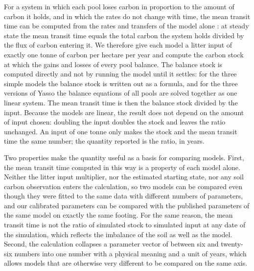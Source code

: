 \documentclass[11pt]{article}
\begin{document}
For a system in which each pool loses carbon in proportion to the amount of carbon it
holds, and in which the rates do not change with time, the mean transit time can be
computed from the rates and transfers of the model alone
\citep{Rasmussen2016,Sierra2017}: at steady state the mean transit time equals the
total carbon the system holds divided by the flux of carbon entering it. We therefore
give each model a litter input of exactly one tonne of carbon per hectare per year and
compute the carbon stock at which the gains and losses of every pool balance. The
balance stock is computed directly and not by running the model until it settles: for
the three simple models the balance stock is written out as a formula, and for the
three versions of Yasso the balance equations of all pools are solved together as one
linear system. The mean transit time is then the balance stock divided by the input.
Because the models are linear, the result does not depend on the amount of input
chosen: doubling the input doubles the stock and leaves the ratio unchanged. An input
of one tonne only makes the stock and the mean transit time the same number; the
quantity reported is the ratio, in years.

Two properties make the quantity useful as a basis for comparing models. First, the
mean transit time computed in this way is a property of each model alone.
Neither the litter input multiplier, nor the estimated starting state, nor any soil
carbon observation enters the calculation, so two models can be compared even though
they were fitted to the same data with different numbers of parameters, and our
calibrated parameters can be compared with the published parameters of the same model
on exactly the same footing. For the same reason, the mean transit time is not the
ratio of simulated stock to simulated input at any date of the simulation, which
reflects the imbalance of the soil as well as the model. Second, the calculation collapses a parameter vector of
between six and twenty-six numbers into one number with a physical meaning and a unit
of years, which allows models that are otherwise very different to be compared on the
same axis.
\end{document}
